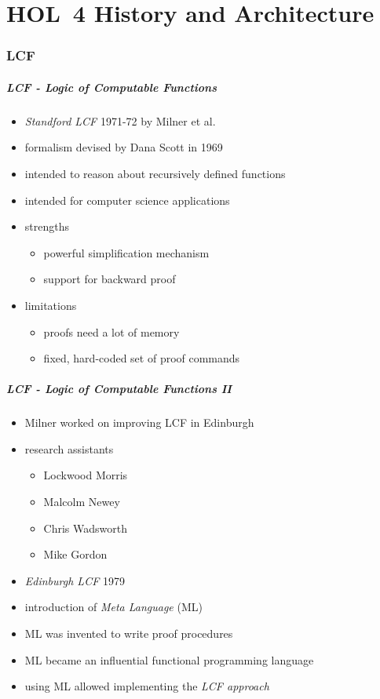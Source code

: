 \part{HOL~4 History and Architecture}

\frame[plain]{\partpage}

\section{LCF}

\begin{frame}
\frametitle{LCF - Logic of Computable Functions}

\begin{itemize}
\item \emph{Standford LCF} 1971-72 by Milner et al.
\item formalism devised by Dana Scott in 1969
\item intended to reason about recursively defined functions 
\item intended for computer science applications
\item strengths
\begin{itemize}
\item powerful simplification mechanism
\item support for backward proof
\end{itemize}
\item limitations
\begin{itemize}
\item proofs need a lot of memory
\item fixed, hard-coded set of proof commands
\end{itemize}
\end{itemize}
\end{frame}

\begin{frame}
\frametitle{LCF - Logic of Computable Functions II}

\begin{itemize}
\item Milner worked on improving LCF in Edinburgh
\item research assistants
\begin{itemize}
\item Lockwood Morris
\item Malcolm Newey
\item Chris Wadsworth
\item Mike Gordon
\end{itemize}
\item \emph{Edinburgh LCF} 1979
\item introduction of \emph{Meta Language} (ML)
\item ML was invented to write proof procedures
\item ML became an influential functional programming language
\item using ML allowed implementing the \emph{LCF approach}
\end{itemize}
\end{frame}


